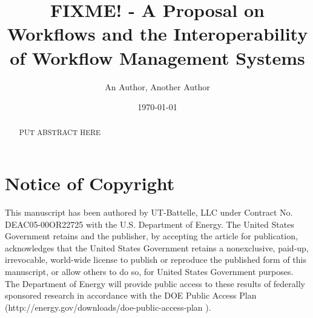 \documentclass{acmart}
\title{FIXME! - A Proposal on Workflows and the Interoperability of Workflow
Management Systems}
\author{An Author, Another Author}
\date{\today}
\begin{document}
\begin{abstract}
PUT ABSTRACT HERE
\end{abstract}

\maketitle

\section{Notice of Copyright}\label{notice-of-copyright}

This manuscript has been authored by UT-Battelle, LLC under Contract No.
DEAC05-00OR22725 with the U.S. Department of Energy. The United States
Government retains and the publisher, by accepting the article for
publication, acknowledges that the United States Government retains a
nonexclusive, paid-up, irrevocable, world-wide license to publish or
reproduce the published form of this manuscript, or allow others to do
so, for United States Government purposes. The Department of Energy will
provide public access to these results of federally sponsored research
in accordance with the DOE Public Access Plan
(http://energy.gov/downloads/doe-public-access-plan ).









\end{document}
